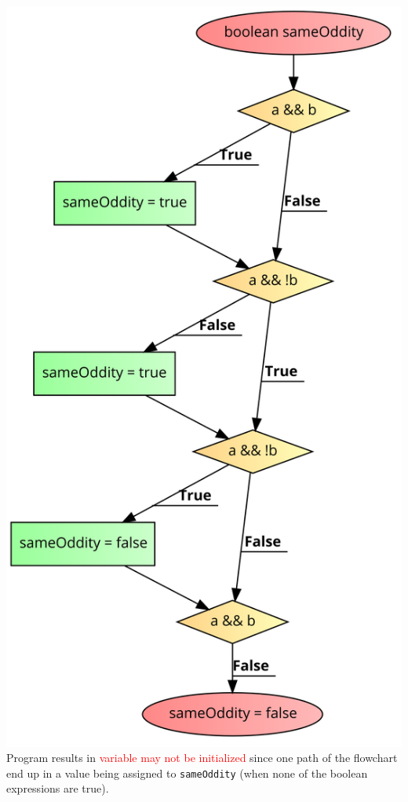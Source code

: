 \begin{questions}
\begin{parts}
\begin{solution}
\includegraphics[scale=0.3]{3.png}
\vskip 0.5cm
Program results in \textcolor{red}{variable may not be initialized} since one path of the flowchart end up in a value being assigned to \texttt{sameOddity} (when none of the boolean expressions are true).
\end{solution}
\end{parts}


\end{questions}
